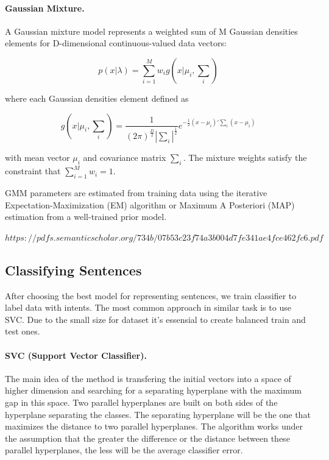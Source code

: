 \documentclass[11pt]{article}
\begin{document}
\paragraph{Gaussian Mixture.}


A Gaussian mixture model represents a weighted sum of M Gaussian densities elements for D-dimensional continuous-valued data vectors:

\begin{equation}
p(x|\lambda) = \sum_{i=1}^{M} w_{i} g(x|\mu_{i}, \sum_{i})
\end{equation}

where each Gaussian densities element defined as 

\begin{equation}
g(x|\mu_{i}, \sum_{i})=\frac{1}{(2\pi)^{\frac{D}{2}}|\sum_{i}|^{\frac{1}{2}}} e^{-\frac{1}{2}(x-\mu_{i})'\sum_{i}(x-\mu_{i})} 
\end{equation}

with mean vector $\mu_{i}$ and covariance matrix $\sum_{i}$. The mixture weights satisfy the constraint that $\sum_{i=1}^{M} w_{i} = 1$.

GMM parameters are estimated from training data using the iterative Expectation-Maximization (EM) algorithm or Maximum A Posteriori (MAP) estimation from a well-trained prior model.

$https://pdfs.semanticscholar.org/734b/07b53c23f74a3b004d7fe341ae4fce462fc6.pdf$

\subsection{Classifying Sentences}

After choosing the best model for representing sentences, we train
classifier to label data with intents. The most common approach in
similar task is to use SVC. Due to the small size for dataset it's
essensial to create balanced train and test ones.

\paragraph{SVC (Support Vector Classifier).} The main idea of ​​the method is transfering the initial vectors into a space of higher dimension and searching for a separating hyperplane with the maximum gap in this space. Two parallel hyperplanes are built on both sides of the hyperplane separating the classes. The separating hyperplane will be the one that maximizes the distance to two parallel hyperplanes. The algorithm works under the assumption that the greater the difference or the distance between these parallel hyperplanes, the less will be the average classifier error.
\end{document}
